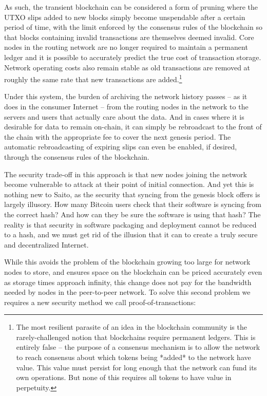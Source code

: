 \documentclass[11.5pt, oneside]{article}   	%
\begin{document}
\begin{multicols}{2}
As such, the transient blockchain can be considered a form of pruning where the UTXO slips added to new blocks simply become unspendable after a certain period of time, with the limit enforced by the consensus rules of the blockchain so that blocks containing invalid transactions are themselves deemed invalid. Core nodes in the routing network are no longer required to maintain a permanent ledger and it is possible to accurately predict the true cost of transaction storage. Network operating costs also remain stable as old transactions are removed at roughly the same rate that new transactions are added.\footnote[1]{The most resilient parasite of an idea in the blockchain community is the rarely-challenged notion that blockchains require permanent ledgers. This is entirely false -- the purpose of a consensus mechanism is to allow the network to reach consensus about which tokens being *added* to the network have value. This value must persist for long enough that the network can fund its own operations. But none of this requires all tokens to have value in perpetuity.}

Under this system, the burden of archiving the network history passes -- as it does in the consumer Internet -- from the routing nodes in the network to the servers and users that actually care about the data. And in cases where it is desirable for data to remain on-chain, it can simply be rebroadcast to the front of the chain with the appropriate fee to cover the next genesis period. The automatic rebroadcasting of expiring slips can even be enabled, if desired, through the consensus rules of the blockchain.

The security trade-off in this approach is that new nodes joining the network become vulnerable to attack at their point of initial connection. And yet this is nothing new to Saito, as the security that syncing from the genesis block offers is largely illusory. How many Bitcoin users check that their software is syncing from the correct hash? And how can they be sure the software is using that hash? The reality is that security in software packaging and deployment cannot be reduced to a hash, and we must get rid of the illusion that it can to create a truly secure and decentralized Internet.

While this avoids the problem of the blockchain growing too large for network nodes to store, and ensures space on the blockchain can be priced accurately even as storage times approach infinity, this change does not pay for the bandwidth needed by nodes in the peer-to-peer network. To solve this second problem we requires a new security method we call proof-of-transactions:


\end{multicols}
\end{document}
